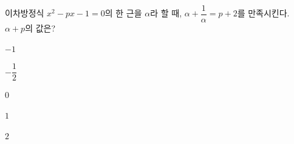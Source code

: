 이차방정식 $x^2-px-1=0$의 한 근을 $\alpha$라 할 때, $\alpha+\dfrac{1}{\alpha}=p+2$를 만족시킨다. $\alpha+p$의 값은? 
\begin{choices32}{\rule[-3ex]{0pt}{8ex}$-1$}{\rule[-3ex]{0pt}{8ex}$-\dfrac{1}{2}$}{\rule[-3ex]{0pt}{8ex}$0$}{\rule[-3ex]{0pt}{8ex}$1$}{\rule[-3ex]{0pt}{8ex}$2$}\end{choices32}

